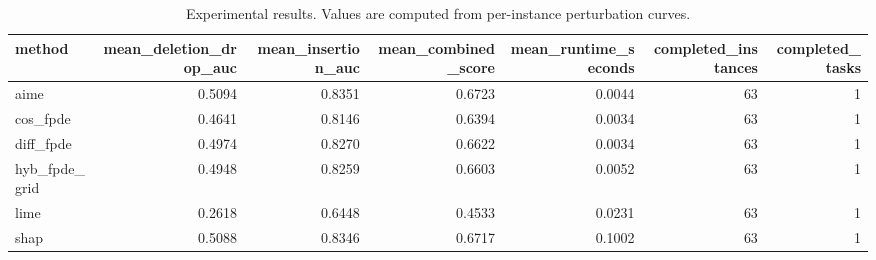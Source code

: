 \begin{table}[t]
\caption{Experimental results. Values are computed from per-instance perturbation curves.}
\label{tab:main_results_computed}
\centering
\begin{tabular}{lrrrrrr}
\toprule
method & mean\_deletion\_drop\_auc & mean\_insertion\_auc & mean\_combined\_score & mean\_runtime\_seconds & completed\_instances & completed\_tasks \\
\midrule
aime & 0.5094 & 0.8351 & 0.6723 & 0.0044 & 63 & 1 \\
cos\_fpde & 0.4641 & 0.8146 & 0.6394 & 0.0034 & 63 & 1 \\
diff\_fpde & 0.4974 & 0.8270 & 0.6622 & 0.0034 & 63 & 1 \\
hyb\_fpde\_grid & 0.4948 & 0.8259 & 0.6603 & 0.0052 & 63 & 1 \\
lime & 0.2618 & 0.6448 & 0.4533 & 0.0231 & 63 & 1 \\
shap & 0.5088 & 0.8346 & 0.6717 & 0.1002 & 63 & 1 \\
\bottomrule
\end{tabular}

\end{table}
